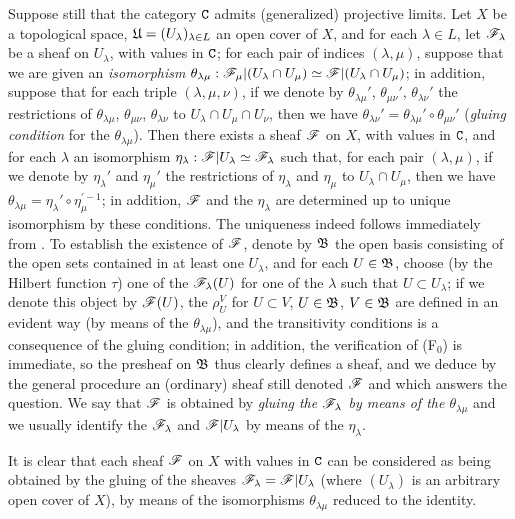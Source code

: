 \begin{env}[3.3.1]
\label{0.3.3.1}
Suppose still that the category $\mathtt{C}$ admits (generalized) projective limits. Let
$X$ be a topological space, $\mathfrak{U}=(U_\lambda)_{\lambda\in L}$ an open
cover of $X$, and for each $\lambda\in L$, let $\mathscr{F}_\lambda$ be a sheaf on
$U_\lambda$, with values in $\mathtt{C}$; for each pair of indices $(\lambda,\mu)$,
suppose that we are given an \emph{isomorphism}
$\theta_{\lambda\mu}:\mathscr{F}_\mu|(U_\lambda\cap U_\mu)
  \simeq\mathscr{F}|(U_\lambda\cap U_\mu)$; in addition, suppose that for each triple
$(\lambda,\mu,\nu)$, if we denote by $\theta_{\lambda\mu}'$, $\theta_{\mu\nu}'$,
$\theta_{\lambda\nu}'$ the restrictions of $\theta_{\lambda\mu}$,
$\theta_{\mu\nu}$, $\theta_{\lambda\nu}$ to $U_\lambda\cap U_\mu\cap U_\nu$,
then we have $\theta_{\lambda\nu}'=\theta_{\lambda\mu}'\circ\theta_{\mu\nu}'$
(\emph{gluing condition} for the $\theta_{\lambda\mu}$). Then there exists a
sheaf $\mathscr{F}$ on $X$, with values in $\mathtt{C}$, and for each $\lambda$ an
isomorphism $\eta_\lambda:\mathscr{F}|U_\lambda\simeq\mathscr{F}_\lambda$ such that, for
each pair $(\lambda,\mu)$, if we denote by $\eta_\lambda'$ and $\eta_\mu'$ the
restrictions of $\eta_\lambda$ and $\eta_\mu$ to $U_\lambda\cap U_\mu$, then we
have $\theta_{\lambda\mu}=\eta_\lambda'\circ\eta_\mu^{\prime-1}$; in addition,
$\mathscr{F}$ and the $\eta_\lambda$ are determined up to unique isomorphism by these
conditions. The uniqueness indeed follows immediately from .
To establish the existence of $\mathscr{F}$, denote by $\mathfrak{B}$ the open basis
consisting of the open sets contained in at least one $U_\lambda$, and for each
$U\in\mathfrak{B}$, choose (by the Hilbert function $\tau$) one of the
$\mathscr{F}_\lambda(U)$ for one of the $\lambda$ such that $U\subset U_\lambda$; if
we denote this object by $\mathscr{F}(U)$, the $\rho_U^V$ for $U\subset V$,
$U\in\mathfrak{B}$, $V\in\mathfrak{B}$ are defined in an evident way (by means
of the $\theta_{\lambda\mu}$), and the transitivity conditions is a consequence
of the gluing condition; in addition, the verification of (F$_0$) is immediate,
so the presheaf on $\mathfrak{B}$ thus clearly defines a sheaf, and we deduce by
the general procedure  an (ordinary) sheaf still denoted
$\mathscr{F}$ and which answers the question. We say that $\mathscr{F}$ is obtained by
\emph{gluing the $\mathscr{F}_\lambda$ by means of the $\theta_{\lambda\mu}$} and we
usually identify the $\mathscr{F}_\lambda$ and $\mathscr{F}|U_\lambda$ by means of the
$\eta_\lambda$.

It is clear that each sheaf $\mathscr{F}$ on $X$ with values in $\mathtt{C}$ can be
considered as being obtained by the gluing of the sheaves
$\mathscr{F}_\lambda=\mathscr{F}|U_\lambda$ (where $(U_\lambda)$ is an arbitrary open
cover of $X$), by means of the isomorphisms $\theta_{\lambda\mu}$ reduced to the
identity.
\end{env}

